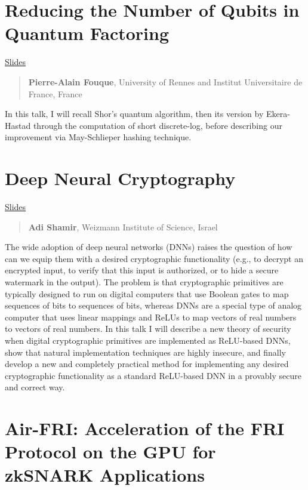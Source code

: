 \documentclass[11pt]{article}
\theoremstyle{definition}
\theoremstyle{remark}
\theoremstyle{plain}
\begin{document}
\section{Reducing the Number of Qubits in Quantum Factoring}
\begin{center}
\href{https://sacworkshop.org/SAC25/slides/fouque.pdf}{Slides}
\end{center}

\begin{quote}
\textbf{Pierre-Alain Fouque}, University of Rennes and Institut Universitaire de France, France
\end{quote}

In this talk, I will recall Shor's quantum algorithm, then its version by Ekera-Hastad through the computation of short discrete-log, before describing our improvement via May-Schlieper hashing technique.

\section{Deep Neural Cryptography}
\begin{center}
\href{https://sacworkshop.org/SAC25/slides/Shamir.pdf}{Slides}
\end{center}

\begin{quote}
\textbf{Adi Shamir}, Weizmann Institute of Science, Israel
\end{quote}

The wide adoption of deep neural networks (DNNs) raises the question of how can we equip them with a desired cryptographic functionality (e.g., to decrypt an encrypted input, to verify that this input is authorized, or to hide a secure watermark in the output). The problem is that cryptographic primitives are typically designed to run on digital computers that use Boolean gates to map sequences of bits to sequences of bits, whereas DNNs are a special type of analog computer that uses linear mappings and ReLUs to map vectors of real numbers to vectors of real numbers. In this talk I will describe a new theory of security when digital cryptographic primitives are implemented as ReLU-based DNNs, show that natural implementation techniques are highly insecure, and finally develop a new and completely practical method for implementing any desired cryptographic functionality as a standard ReLU-based DNN in a provably secure and correct way.




\section{Air-FRI: Acceleration of the FRI Protocol on the GPU for zkSNARK Applications}
\end{document}
